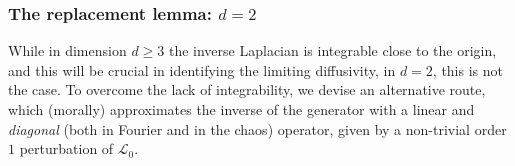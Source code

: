 \documentclass[reqno,11pt]{preprint}
\newcommand{\J}{\mathbb{J}}
\newcommand{\cA}{\mathcal{A}}
\newcommand{\cL}{\mathcal{L}}
\newcommand{\1}{\mathds{1}}
\def\indN#1{{	\J^\eps_{#1}	}}
\newcommand{\gensy}{\cL_0}
\newcommand{\genap}{\cA^{\eps}_+}
\begin{document}

\subsubsection{The replacement lemma: $d=2$}\label{sec:ReplLemma}


{While in dimension $d\geq 3$ the inverse Laplacian is integrable close to the origin, 
and this will be crucial in identifying the limiting diffusivity, }
in $d=2$, this is not the case. To overcome the lack of integrability, we devise an alternative route, 
which (morally) approximates the inverse of the generator with a linear 
and  {\it diagonal} (both in Fourier and in the chaos) operator, 
given by a non-trivial order $1$ perturbation of $\gensy$. 
\end{document}
